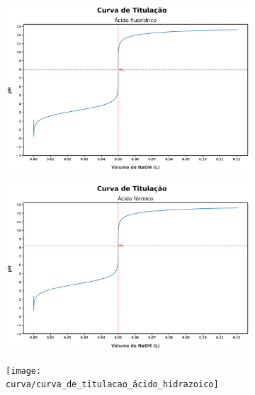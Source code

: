 \documentclass[a4paper, 12pt]{article}
\begin{document}
\begin{figure}[H]
\begin{subfigure}{0.5\textwidth}
		\includegraphics[width=0.9\linewidth]{curva/curva_de_titulacao_ácido_fluorídrico}
		\caption{}
		\label{fig:curvadetitulacaoácidofluorídrico}
	\end{subfigure}
	\begin{subfigure}{0.5\textwidth}
		\centering
		\includegraphics[width=0.9\linewidth]{curva/curva_de_titulacao_ácido_fórmico}
		\caption{}
		\label{fig:curvadetitulacaoácidofórmico}
	\end{subfigure}
	\begin{subfigure}{0.5\textwidth}
		\centering
		\texttt{[image: curva/curva\_de\_titulacao\_ácido\_hidrazoico]}
		\caption{}
		\label{fig:curvadetitulacaoácidohidrazoico}
	\end{subfigure}
\end{figure}
\end{document}

